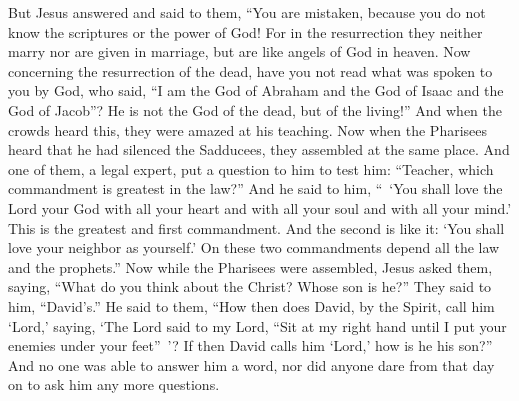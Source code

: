 \begin{biblechapter}
\verse But Jesus answered and said to them, “You are mistaken, because you do not know the scriptures or the power of God!
\verse For in the resurrection they neither marry nor are given in marriage, but are like angels of God in heaven.
\verse Now concerning the resurrection of the dead, have you not read what was spoken to you by God, who said,
\verse “I am the God of Abraham and the God of Isaac and the God of Jacob”? He is not the God of the dead, but of the living!”
\verse And when the crowds heard this, they were amazed at his teaching.
 Now when the Pharisees heard that he had silenced the Sadducees, they assembled at the same place.
\verse And one of them, a legal expert, put a question to him to test him:
\verse “Teacher, which commandment is greatest in the law?”
\verse And he said to him, “ ‘You shall love the Lord your God with all your heart and with all your soul and with all your mind.’
\verse This is the greatest and first commandment.
\verse And the second is like it: ‘You shall love your neighbor as yourself.’
\verse On these two commandments depend all the law and the prophets.”
 Now while the Pharisees were assembled, Jesus asked them,
\verse saying, “What do you think about the Christ? Whose son is he?” They said to him, “David’s.”
\verse He said to them, “How then does David, by the Spirit, call him ‘Lord,’ saying,
\verse ‘The Lord said to my Lord, 
“Sit at my right hand 
until I put your enemies 
under your feet” ’?
\verse If then David calls him ‘Lord,’ how is he his son?”
\verse And no one was able to answer him a word, nor did anyone dare from that day on to ask him any more questions.
\end{biblechapter}

